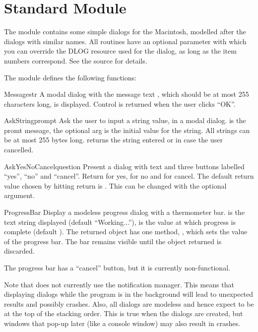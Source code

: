 \section{Standard Module }
\label{module-EasyDialogs}

The  module contains some simple dialogs for
the Macintosh, modelled after the  dialogs with similar
names. All routines have an optional parameter  with which you
can override the DLOG resource used for the dialog, as long as the
item numbers correspond. See the source for details.
 
The  module defines the following functions:


\begin{funcdesc}{Message}{str}
A modal dialog with the message text , which should be at
most 255 characters long, is displayed. Control is returned when the
user clicks ``OK''.
\end{funcdesc}

\begin{funcdesc}{AskString}{prompt}
Ask the user to input a string value, in a modal dialog. 
is the promt message, the optional  arg is the initial
value for the string. All strings can be at most 255 bytes
long.  returns the string entered or 
in case the user cancelled.
\end{funcdesc}

\begin{funcdesc}{AskYesNoCancel}{question}
Present a dialog with text  and three buttons labelled
``yes'', ``no'' and ``cancel''. Return  for yes,  for
no and  for cancel. The default return value chosen by
hitting return is . This can be changed with the optional
 argument.
\end{funcdesc}

\begin{funcdesc}{ProgressBar}{}
Display a modeless progress dialog with a thermometer bar. 
is the text string displayed (default ``Working...''),  is
the value at which progress is complete (default ). The
returned object has one method, , which sets
the value of the progress bar. The bar remains visible until the
object returned is discarded.

The progress bar has a ``cancel'' button, but it is currently
non-functional.
\end{funcdesc}

Note that  does not currently use the notification
manager. This means that displaying dialogs while the program is in
the background will lead to unexpected results and possibly
crashes. Also, all dialogs are modeless and hence expect to be at the
top of the stacking order. This is true when the dialogs are created,
but windows that pop-up later (like a console window) may also result
in crashes.
